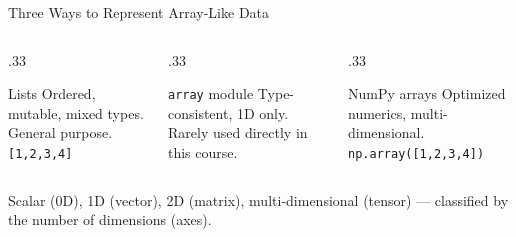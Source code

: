 \documentclass[9pt,aspectratio=169,xcolor=table]{beamer}
\begin{document}
\begin{frame}{Three Ways to Represent Array-Like Data}
    \leavevmode
    \small
    \begin{columns}[t]
        \begin{column}{.33\textwidth}
            \begin{block}{Lists}
                \scriptsize Ordered, mutable, mixed types. General
                purpose. \texttt{[1,2,3,4]}
            \end{block}
        \end{column}
        \begin{column}{.33\textwidth}
            \begin{block}{\texttt{array} module}
                \scriptsize Type-consistent, 1D only. Rarely used
                directly in this course.
            \end{block}
        \end{column}
        \begin{column}{.33\textwidth}
            \begin{block}{NumPy arrays}
                \scriptsize Optimized numerics, multi-dimensional.
                \texttt{np.array([1,2,3,4])}
            \end{block}
        \end{column}
    \end{columns}

    \vspace{3mm}
    {\small \alert{Scalar} (0D), \alert{1D} (vector), \alert{2D}
    (matrix), \alert{multi-dimensional} (tensor) --- classified by the
    number of dimensions (axes).}
\end{frame}
\end{document}
